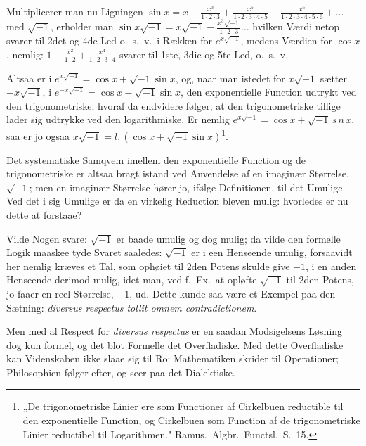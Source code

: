 \documentclass[12pt]{book}
\newcommand{\opage}[1]{\marginnote{\footnotesize\textit{[#1]}}}
\begin{document}
Multiplicerer man nu Ligningen $\sin x = x - \frac{x^{3}}{1\cdot 2\cdot 3} +
\frac{x^{5}}{1\cdot 2\cdot 3\cdot 4\cdot 5} - \frac{x^{6}}{1\cdot 2\cdot 3\cdot
4\cdot 5\cdot 6} + \dots$
med $\sqrt{-1}$, erholder man $\sin x\sqrt{-1} = x\sqrt{-1} -
\frac{x^{3}\sqrt{-1}}{1\cdot 2\cdot 3}\dots$ hvilken Værdi netop svarer til 2det
og 4de Led o.\ s.\ v.\ i Rækken for $e^{x\sqrt{-1}}$, medens Værdien for
$\cos x$, nemlig: $1 - \frac{x^{2}}{1\cdot 2} + \frac{x^{4}}{1\cdot 2\cdot 3\cdot
4}$ svarer til 1ste, 3die og 5te Led, o.\ s.\ v.

Altsaa er i $e^{x\sqrt{-1}} = \cos x + \sqrt{-1}\sin x$, og, naar man istedet for
$x\sqrt{-1}$ sætter $-x\sqrt{-1}$, i $e^{-x\sqrt{-1}} = \cos x - \sqrt{-1}\sin x$,
den exponentielle Function udtrykt ved den trigonometriske; hvoraf da endvidere
følger, at den trigonometriske tillige lader sig udtrykke ved den logarithmiske.
Er nemlig $e^{x\sqrt{-1}} = \cos x + \sqrt{-1}\,s\,n\,x$,
saa er jo ogsaa $x\sqrt{-1} = l.\,(\cos x + \sqrt{-1}\sin x)$\footnote{„De
trigonometriske Linier ere som Functioner af Cirkelbuen reductible til den
exponentielle Function, og Cirkelbuen som Function af de trigonometriske Linier
reductibel til Logarithmen." Ramus.\ Algbr.\ Functsl.\ S.\ 15.}.

\opage{38} Det systematiske Samqvem imellem den exponentielle Function og de trigonometriske
er altsaa bragt istand ved Anvendelse af en imaginær Størrelse, $\sqrt{-1}$; men
en imaginær Størrelse hører jo, ifølge Definitionen, til det Umulige. Ved det i
sig Umulige er da en virkelig Reduction bleven mulig: hvorledes er nu dette at
forstaae?

Vilde Nogen svare: $\sqrt{-1}$ er baade umulig og dog mulig; da vilde den formelle
Logik maaskee tyde Svaret saaledes: $\sqrt{-1}$ er i een Henseende umulig,
forsaavidt her nemlig kræves et Tal, som ophøiet til 2den Potens skulde give
$-1$, i en anden Henseende derimod mulig, idet man, ved f.\ Ex.\ at opløfte
$\sqrt{-1}$ til 2den Potens, jo faaer en reel Størrelse, $-1$, ud. Dette kunde saa
være et Exempel paa den Sætning: \textit{diversus respectus tollit omnem
contradictionem}.

Men med al Respect for \textit{diversus respectus} er en saadan Modsigelsens
Løsning dog kun formel, og det blot Formelle det Overfladiske. Med dette
Overfladiske kan Videnskaben ikke slaae sig til Ro: Mathematiken skrider til
Operationer; Philosophien følger efter, og seer paa det Dialektiske.
\end{document}
